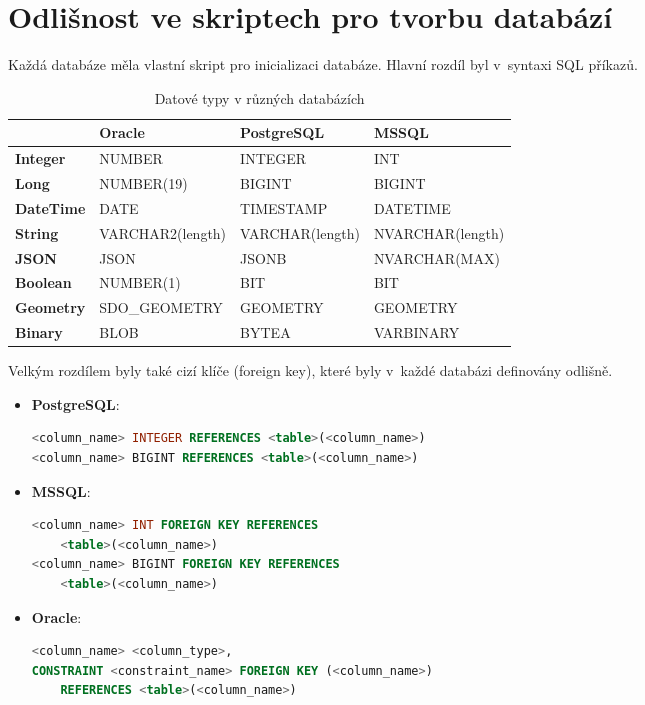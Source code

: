\section{Odlišnost ve skriptech pro tvorbu databází}
Každá databáze měla vlastní skript pro inicializaci databáze.  
Hlavní rozdíl byl v~syntaxi SQL příkazů.

\renewcommand{\arraystretch}{1.3}
\begin{table}[!h]
\centering
\caption{Datové typy v různých databázích}
\label{tab:datove_typy}
    \begin{tabular}{|l|l|l|l|}
        \hline
         & \textbf{Oracle} & \textbf{PostgreSQL} & \textbf{MSSQL} \\ \hline
        \textbf{Integer}     & NUMBER           & INTEGER           & INT               \\ \hline
        \textbf{Long}        & NUMBER(19)       & BIGINT            & BIGINT            \\ \hline
        \textbf{DateTime}    & DATE             & TIMESTAMP         & DATETIME          \\ \hline
        \textbf{String}      & VARCHAR2(length) & VARCHAR(length)   & NVARCHAR(length)  \\ \hline
        \textbf{JSON}        & JSON             & JSONB             & NVARCHAR(MAX)     \\ \hline
        \textbf{Boolean}     & NUMBER(1)        & BIT               & BIT               \\ \hline
        \textbf{Geometry}    & SDO\_GEOMETRY    & GEOMETRY          & GEOMETRY          \\ \hline
        \textbf{Binary}      & BLOB             & BYTEA             & VARBINARY         \\ \hline
    \end{tabular}
\end{table}

Velkým rozdílem byly také cizí klíče (foreign key), které byly v~každé databázi definovány odlišně.

\newpage

\begin{itemize}
    \item \textbf{PostgreSQL}:
    \begin{lstlisting}[language=sql]
<column_name> INTEGER REFERENCES <table>(<column_name>)
<column_name> BIGINT REFERENCES <table>(<column_name>)
    \end{lstlisting}

    \item \textbf{MSSQL}:
    \begin{lstlisting}[language=sql]
<column_name> INT FOREIGN KEY REFERENCES 
    <table>(<column_name>)
<column_name> BIGINT FOREIGN KEY REFERENCES 
    <table>(<column_name>)
    \end{lstlisting}

    \item \textbf{Oracle}:
    \begin{lstlisting}[language=sql]
<column_name> <column_type>,
CONSTRAINT <constraint_name> FOREIGN KEY (<column_name>) 
    REFERENCES <table>(<column_name>)
    \end{lstlisting}
\end{itemize}